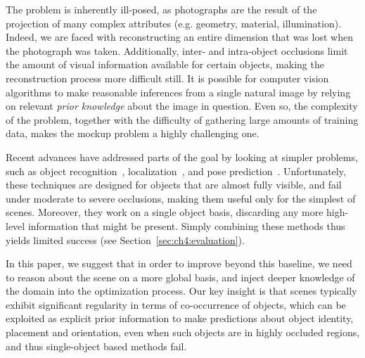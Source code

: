 \documentclass[10pt,twocolumn,letterpaper]{article}
\begin{document}
The problem is inherently ill-posed, as photographs are the result of the
projection of many complex attributes (e.g. geometry, material, illumination).
Indeed, we are faced with reconstructing an entire dimension that was lost when the
photograph was taken. Additionally, inter- and intra-object occlusions limit
the amount of visual information available for certain objects, making the
reconstruction process more difficult still. It is possible for computer vision
algorithms to make reasonable inferences from a single natural image by relying
on relevant \emph{prior knowledge} about the image in question. Even so, the
complexity of the problem, together with the difficulty of gathering large
amounts of training data, makes the mockup problem a highly challenging one.

Recent advances have addressed parts of the goal by looking at simpler problems,
such as object recognition~\cite{He:2016:CVPR}, localization~\cite{Ren:2015:NIPS}, and pose prediction~\cite{Wu:2016:ECCV}. Unfortunately,
these techniques are designed for objects that are almost fully visible, and
fail under moderate to severe occlusions, making them useful only for the
simplest of scenes. Moreover, they work on a single object basis, discarding
any more high-level information that might be present. Simply combining these
methods thus yields limited success (see Section~\ref{sec:ch4:evaluation}).

In this paper, we suggest that in order to improve beyond this baseline, we need
to reason about the scene on a more global basis, and inject deeper knowledge of
the domain into the optimization process. Our key insight is that scenes
typically exhibit significant regularity in terms of co-occurrence of objects,
which can be exploited as explicit prior information to make predictions about
object identity, placement and orientation, even when such objects are in
highly occluded regions, and thus single-object based methods fail.
\end{document}
